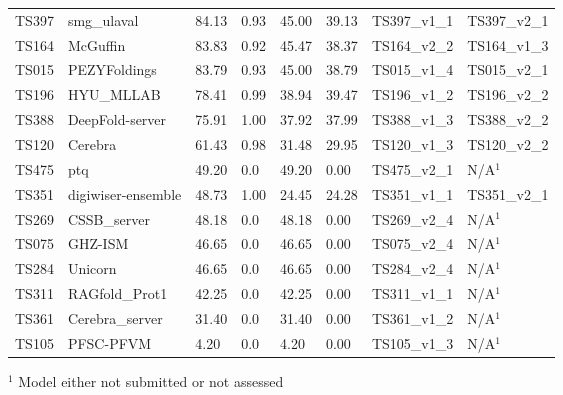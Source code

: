 \begin{table}[ht]
{\begin{tabular}{llllllll}
TS397 & smg\_ulaval & 84.13 & 0.93 & 45.00 & 39.13 & TS397\_v1\_1 & TS397\_v2\_1 \\ 
TS164 & McGuffin & 83.83 & 0.92 & 45.47 & 38.37 & TS164\_v2\_2 & TS164\_v1\_3 \\ 
TS015 & PEZYFoldings & 83.79 & 0.93 & 45.00 & 38.79 & TS015\_v1\_4 & TS015\_v2\_1 \\ 
TS196 & HYU\_MLLAB & 78.41 & 0.99 & 38.94 & 39.47 & TS196\_v1\_2 & TS196\_v2\_2 \\ 
TS388 & DeepFold-server & 75.91 & 1.00 & 37.92 & 37.99 & TS388\_v1\_3 & TS388\_v2\_2 \\ 
TS120 & Cerebra & 61.43 & 0.98 & 31.48 & 29.95 & TS120\_v1\_3 & TS120\_v2\_2 \\ 
TS475 & ptq & 49.20 & 0.0 & 49.20 & 0.00 & TS475\_v2\_1 & N/A$^{1}$ \\ 
TS351 & digiwiser-ensemble & 48.73 & 1.00 & 24.45 & 24.28 & TS351\_v1\_1 & TS351\_v2\_1 \\ 
TS269 & CSSB\_server & 48.18 & 0.0 & 48.18 & 0.00 & TS269\_v2\_4 & N/A$^{1}$ \\ 
TS075 & GHZ-ISM & 46.65 & 0.0 & 46.65 & 0.00 & TS075\_v2\_4 & N/A$^{1}$ \\ 
TS284 & Unicorn & 46.65 & 0.0 & 46.65 & 0.00 & TS284\_v2\_4 & N/A$^{1}$ \\ 
TS311 & RAGfold\_Prot1 & 42.25 & 0.0 & 42.25 & 0.00 & TS311\_v1\_1 & N/A$^{1}$ \\ 
TS361 & Cerebra\_server & 31.40 & 0.0 & 31.40 & 0.00 & TS361\_v1\_2 & N/A$^{1}$ \\ 
TS105 & PFSC-PFVM & 4.20 & 0.0 & 4.20 & 0.00 & TS105\_v1\_3 & N/A$^{1}$ \\ 
\bottomrule
\end{tabular}%
}
\begin{flushleft}\footnotesize $^{1}$ Model either not submitted or not assessed\end{flushleft}
\end{table}
